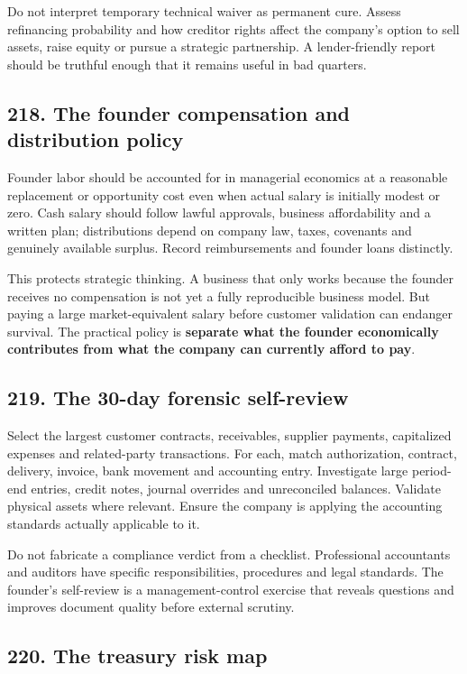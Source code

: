 Do not interpret temporary technical waiver as permanent cure. Assess refinancing probability and how creditor rights affect the company's option to sell assets, raise equity or pursue a strategic partnership. A lender-friendly report should be truthful enough that it remains useful in bad quarters.

\subsection{218. The founder compensation and distribution policy}


Founder labor should be accounted for in managerial economics at a reasonable replacement or opportunity cost even when actual salary is initially modest or zero. Cash salary should follow lawful approvals, business affordability and a written plan; distributions depend on company law, taxes, covenants and genuinely available surplus. Record reimbursements and founder loans distinctly.

This protects strategic thinking. A business that only works because the founder receives no compensation is not yet a fully reproducible business model. But paying a large market-equivalent salary before customer validation can endanger survival. The practical policy is \textbf{separate what the founder economically contributes from what the company can currently afford to pay}.

\subsection{219. The 30-day forensic self-review}


Select the largest customer contracts, receivables, supplier payments, capitalized expenses and related-party transactions. For each, match authorization, contract, delivery, invoice, bank movement and accounting entry. Investigate large period-end entries, credit notes, journal overrides and unreconciled balances. Validate physical assets where relevant. Ensure the company is applying the accounting standards actually applicable to it.

Do not fabricate a compliance verdict from a checklist. Professional accountants and auditors have specific responsibilities, procedures and legal standards. The founder's self-review is a management-control exercise that reveals questions and improves document quality before external scrutiny.

\subsection{220. The treasury risk map}



